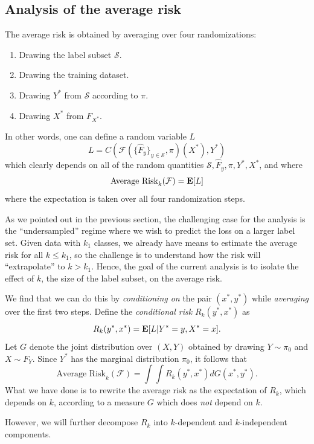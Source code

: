 \documentclass[12pt]{article}
\begin{document}
\subsection{Analysis of the average risk}

The average risk is obtained by averaging over four randomizations:
\begin{enumerate}
\item Drawing the label subset $\mathcal{S}$.
\item Drawing the training dataset.
\item Drawing $Y^*$ from $\mathcal{S}$ according to $\pi$.
\item Drawing $X^*$ from $F_{X^*}$.
\end{enumerate}

In other words, one can define a random variable $L$
\[
L = C(\mathcal{F}(\{\hat{F}_y\}_{y \in \mathcal{S}}, \pi)(X^*), Y^*)
\]
which clearly depends on all of the random quantities $\mathcal{S}, \hat{F}_y, \pi, Y^*, X^*$, and where
\[
\text{Average Risk}_k(\mathcal{F}) = \textbf{E}[L]
\]
where the expectation is taken over all four randomization steps.

As we pointed out in the previous section, the challenging case for
the analysis is the ``undersampled'' regime where we wish to predict
the loss on a larger label set.  Given data with $k_1$ classes, we
already have means to estimate the average risk for all $k \leq k_1$,
so the challenge is to understand how the risk will ``extrapolate'' to
$k > k_1$.  Hence, the goal of the current analysis is to isolate the
effect of $k$, the size of the label subset, on the average risk.

We find that we can do this by \emph{conditioning on} the pair $(x^*,
y^*)$ while \emph{averaging} over the first two steps.
Define the \emph{conditional risk} $R_k(y^*, x^*)$ as
\[
R_k(y^*, x^*) = \textbf{E}[L|Y^*=y, X^* = x].
\]
Let $G$ denote the joint distribution over $(X, Y)$ obtained by
drawing $Y \sim \pi_0$ and $X \sim F_Y$.  Since $Y^*$ has the marginal
distribution $\pi_0$, it follows that
\begin{equation}\label{eq:rk_eq}
\text{Average Risk}_k(\mathcal{F}) = \int \int R_k(y^*, x^*) dG(x^*, y^*).
\end{equation}
What we have done is to rewrite the average risk as the expectation of
$R_k$, which depends on $k$, according to a measure $G$ which does
\emph{not} depend on $k$.

However, we will further decompose $R_k$ into $k$-dependent and $k$-independent components.
\end{document}
